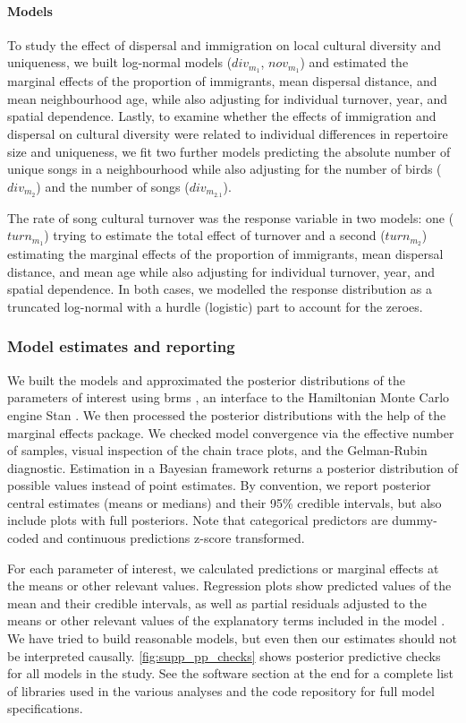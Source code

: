 \documentclass[9pt, onecolumn, twoside, lineno]{gsajnl}
\begin{document}
\paragraph{Models}

To study the effect of dispersal and immigration on local cultural diversity and uniqueness, we built log-normal models ($div_{m_1}$, $nov_{m_1}$) and estimated the marginal effects of the proportion of immigrants, mean dispersal distance, and mean neighbourhood age, while also adjusting for individual turnover, year, and spatial dependence. Lastly, to examine whether the effects of immigration and dispersal on cultural diversity were related to individual differences in repertoire size and uniqueness, we fit two further models predicting the absolute number of unique songs in a neighbourhood while also adjusting for the number of birds ($div_{m_2}$) and the number of songs ($div_{m_{2.1}}$).

The rate of song cultural turnover was the response variable in two models: one ($turn_{m_1}$) trying to estimate the total effect of turnover and a second ($turn_{m_2}$) estimating the marginal effects of the proportion of immigrants, mean dispersal distance, and mean age while also adjusting for individual turnover, year, and spatial dependence. In both cases, we modelled the response distribution as a truncated log-normal with a hurdle (logistic) part to account for the zeroes. 

\subsubsection{Model estimates and reporting}

We built the models and approximated the posterior distributions of the parameters of interest using brms \autocite{brms2017}, an interface to the Hamiltonian Monte Carlo engine Stan \autocite{stan2023}. We then processed the posterior distributions with the help of the marginal effects package. We checked model convergence via the effective number of samples, visual inspection of the chain trace plots, and the Gelman-Rubin diagnostic. Estimation in a Bayesian framework returns a posterior distribution of possible values instead of point estimates. By convention, we report posterior central estimates (means or medians) and their 95\% credible intervals, but also include plots with full posteriors. Note that categorical predictors are dummy-coded and continuous predictions z-score transformed.

For each parameter of interest, we calculated predictions or marginal effects at the means or other relevant values.  Regression plots show predicted values of the mean and their credible intervals, as well as partial residuals adjusted to the means or other relevant values of the explanatory terms included in the model \autocite{fox2018, larsen1972}. We have tried to build reasonable models, but even then our estimates should not be interpreted causally. \autoref{fig:supp_pp_checks} shows posterior predictive checks for all models in the study. See the software section at the end for a complete list of libraries used in the various analyses and the code repository for full model specifications.
\end{document}
